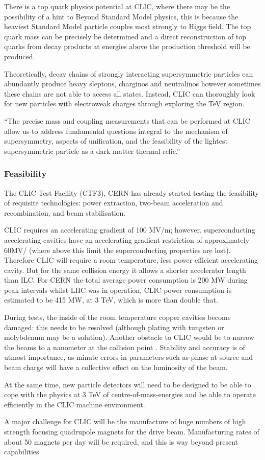 There is a top quark physics potential at CLIC, where there may be the possibility of a hint to Beyond Standard Model physics, this is because the heaviest Standard Model particle couples most strongly to Higgs field. The top quark mass can be precisely be determined and a direct reconstruction of top quarks from decay products at energies above the production threshold will be produced.
 
Theoretically, decay chains of strongly interacting supersymmetric particles can abundantly produce heavy sleptons, charginos and neutralinos however sometimes these chains are not able to access all states. Instead, CLIC can thoroughly look for new particles with electroweak charges through exploring the TeV region. \cite{CLIC:Concept}

``The precise mass and coupling measurements that can be performed at CLIC allow us to address fundamental questions integral to the mechanism of supersymmetry, aspects of unification, and the feasibility of the lightest supersymmetric particle as a dark matter thermal relic.'' \cite{CLIC:Concept}
 
\subsubsection{Feasibility}

The CLIC Test Facility (CTF3), CERN has already started testing the feasibility of requisite technologies: power extraction, two-beam acceleration and recombination, and beam stabilisation. \cite{CLIC:DriveBeam}

CLIC requires an accelerating gradient of 100 MV/m; however, superconducting accelerating cavities have an accelerating gradient restriction of approximately 60MV/ (where above this limit the superconducting properties are lost). Therefore CLIC will require a room temperature, less power-efficient accelerating cavity. But for the same collision energy it allows a shorter accelerator length than ILC. For CERN the total average power consumption is 200 MW during peak intervals whilst LHC was in operation, CLIC power consumption is estimated to be 415 MW, at 3 TeV, which is more than double that.\cite{CERN:Powering}

During tests, the inside of the room temperature copper cavities become damaged: this needs to be resolved (although plating with tungsten or molybdenum may be a solution). Another obstacle to CLIC would be to narrow the beams to a nanometer at the collision point \cite{Nuclear:CTF3}. Stability and accuracy is of utmost importance, as minute errors in parameters such as phase at source and beam charge will have a collective effect on the luminosity of the beam. \cite{CLIC:DriveBeam}

At the same time, new particle detectors will need to be designed to be able to cope with the physics at 3 TeV of centre-of-mass-energies and be able to operate efficiently in the CLIC machine environment. \cite{CLIC:Concept}

A major challenge for CLIC will be the manufacture of huge numbers of high strength focusing quadrupole magnets for the drive beam. Manufacturing rates of about 50 magnets per day will be required, and this is way beyond present capabilities. \cite{CLIC:STFC}